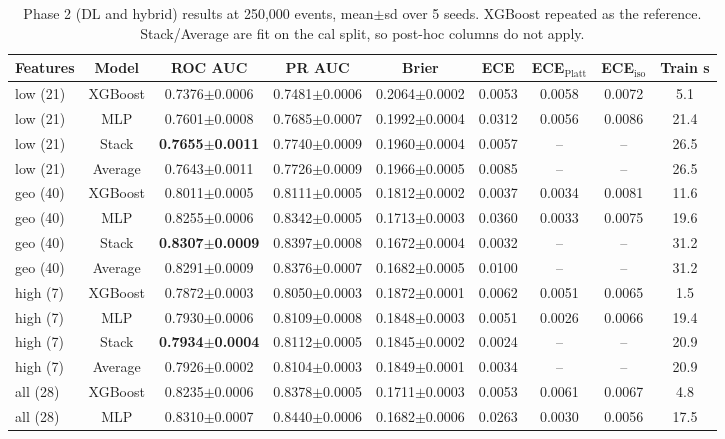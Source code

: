 \begin{table}[!t]
\centering
\caption{Phase 2 (DL and hybrid) results at 250,000 events, mean$\pm$sd over 5 seeds. XGBoost repeated as the reference. Stack/Average are fit on the cal split, so post-hoc columns do not apply.}
\label{tab:dl_main}
\footnotesize
\setlength{\tabcolsep}{3.5pt}
\begin{tabular}{lcccccccc}
\toprule
Features & Model & ROC AUC & PR AUC & Brier & ECE & ECE$_\mathrm{Platt}$ & ECE$_\mathrm{iso}$ & Train s \\
\midrule
low (21) & XGBoost & 0.7376$\pm$0.0006 & 0.7481$\pm$0.0006 & 0.2064$\pm$0.0002 & 0.0053 & 0.0058 & 0.0072 & 5.1 \\
low (21) & MLP & 0.7601$\pm$0.0008 & 0.7685$\pm$0.0007 & 0.1992$\pm$0.0004 & 0.0312 & 0.0056 & 0.0086 & 21.4 \\
low (21) & Stack & \textbf{0.7655$\pm$0.0011} & 0.7740$\pm$0.0009 & 0.1960$\pm$0.0004 & 0.0057 & -- & -- & 26.5 \\
low (21) & Average & 0.7643$\pm$0.0011 & 0.7726$\pm$0.0009 & 0.1966$\pm$0.0005 & 0.0085 & -- & -- & 26.5 \\
geo (40) & XGBoost & 0.8011$\pm$0.0005 & 0.8111$\pm$0.0005 & 0.1812$\pm$0.0002 & 0.0037 & 0.0034 & 0.0081 & 11.6 \\
geo (40) & MLP & 0.8255$\pm$0.0006 & 0.8342$\pm$0.0005 & 0.1713$\pm$0.0003 & 0.0360 & 0.0033 & 0.0075 & 19.6 \\
geo (40) & Stack & \textbf{0.8307$\pm$0.0009} & 0.8397$\pm$0.0008 & 0.1672$\pm$0.0004 & 0.0032 & -- & -- & 31.2 \\
geo (40) & Average & 0.8291$\pm$0.0009 & 0.8376$\pm$0.0007 & 0.1682$\pm$0.0005 & 0.0100 & -- & -- & 31.2 \\
high (7) & XGBoost & 0.7872$\pm$0.0003 & 0.8050$\pm$0.0003 & 0.1872$\pm$0.0001 & 0.0062 & 0.0051 & 0.0065 & 1.5 \\
high (7) & MLP & 0.7930$\pm$0.0006 & 0.8109$\pm$0.0008 & 0.1848$\pm$0.0003 & 0.0051 & 0.0026 & 0.0066 & 19.4 \\
high (7) & Stack & \textbf{0.7934$\pm$0.0004} & 0.8112$\pm$0.0005 & 0.1845$\pm$0.0002 & 0.0024 & -- & -- & 20.9 \\
high (7) & Average & 0.7926$\pm$0.0002 & 0.8104$\pm$0.0003 & 0.1849$\pm$0.0001 & 0.0034 & -- & -- & 20.9 \\
all (28) & XGBoost & 0.8235$\pm$0.0006 & 0.8378$\pm$0.0005 & 0.1711$\pm$0.0003 & 0.0053 & 0.0061 & 0.0067 & 4.8 \\
all (28) & MLP & 0.8310$\pm$0.0007 & 0.8440$\pm$0.0006 & 0.1682$\pm$0.0006 & 0.0263 & 0.0030 & 0.0056 & 17.5 \\

\end{tabular}
\end{table}
